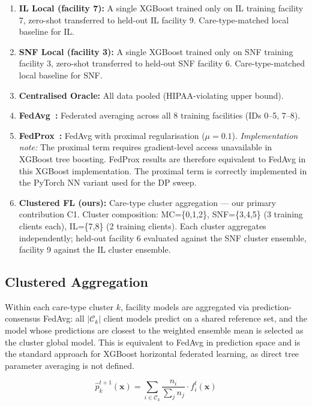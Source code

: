 \documentclass[journal]{IEEEtran}
\begin{document}
\begin{enumerate}
  \item \textbf{IL Local (facility 7):} A single XGBoost trained only on IL
  training facility 7, zero-shot transferred to held-out IL facility 9.
  Care-type-matched local baseline for IL.
  \item \textbf{SNF Local (facility 3):} A single XGBoost trained only on SNF
  training facility 3, zero-shot transferred to held-out SNF facility 6.
  Care-type-matched local baseline for SNF.
  \item \textbf{Centralised Oracle:} All data pooled (HIPAA-violating upper bound).
  \item \textbf{FedAvg~\cite{mcmahan2017}:} Federated averaging across all 8 training facilities
  (IDs 0--5, 7--8).
  \item \textbf{FedProx~\cite{li2020fedprox}:} FedAvg with proximal regularisation
  ($\mu=0.1$). \textit{Implementation note:} The proximal term requires gradient-level
  access unavailable in XGBoost tree boosting. FedProx results are therefore
  equivalent to FedAvg in this XGBoost implementation. The proximal term is
  correctly implemented in the PyTorch NN variant used for the DP sweep.
  \item \textbf{Clustered FL (ours):} Care-type cluster aggregation --- our primary
  contribution C1. Cluster composition: MC=\{0,1,2\}, SNF=\{3,4,5\} (3 training clients
  each), IL=\{7,8\} (2 training clients). Each cluster aggregates independently;
  held-out facility 6 evaluated against the SNF cluster ensemble, facility 9
  against the IL cluster ensemble.
\end{enumerate}

\subsection{Clustered Aggregation}
Within each care-type cluster $k$, facility models are aggregated via
prediction-consensus FedAvg: all $|\mathcal{C}_k|$ client models predict on a
shared reference set, and the model whose predictions are closest to the
weighted ensemble mean is selected as the cluster global model. This is
equivalent to FedAvg in prediction space and is the standard approach for
XGBoost horizontal federated learning, as direct tree parameter averaging is
not defined.

\begin{equation}
\hat{p}^{t+1}_k(\mathbf{x}) = \sum_{i \in \mathcal{C}_k} \frac{n_i}{\sum_j n_j}
  \cdot f_i^t(\mathbf{x})
\label{eq:agg}
\end{equation}
\end{document}
